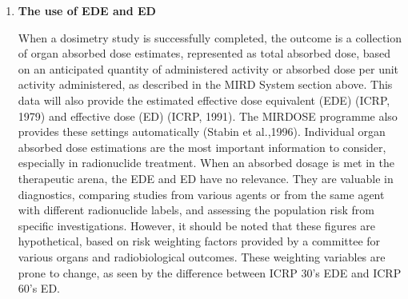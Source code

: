 \documentclass[12pt]{article}
\begin{document}
\begin{enumerate}
\item \textbf{ The use of EDE and ED} \par When a dosimetry study is successfully completed, the outcome is a collection of organ absorbed dose estimates, represented as total absorbed dose, based on an anticipated quantity of administered activity or absorbed dose per unit activity administered, as described in the MIRD System section above. This data will also provide the estimated effective dose equivalent (EDE) (ICRP, 1979) and effective dose (ED) (ICRP, 1991). The MIRDOSE programme also provides these settings automatically (Stabin et al.,1996). Individual organ absorbed dose estimations are the most important information to consider, especially in radionuclide treatment. When an absorbed dosage is met in the therapeutic arena, the EDE and ED have no relevance. They are valuable in diagnostics, comparing studies from various agents or from the same agent with different radionuclide labels, and assessing the population risk from specific investigations. However, it should be noted that these figures are hypothetical, based on risk weighting factors provided by a committee for various organs and radiobiological outcomes. These weighting variables are prone to change, as seen by the difference between ICRP 30's EDE and ICRP 60's ED.


\end{enumerate}
\end{document}
